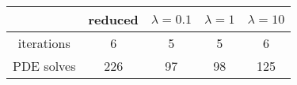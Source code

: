 \begin{tabular}{ccccc}
& reduced & $\lambda = 0.1$ & $\lambda = 1$ & $\lambda = 10$ \\
\hline
iterations & 6 & 5 & 5 & 6 \\
PDE solves & 226 & 97 & 98 & 125 \\
\hline
\end{tabular}

